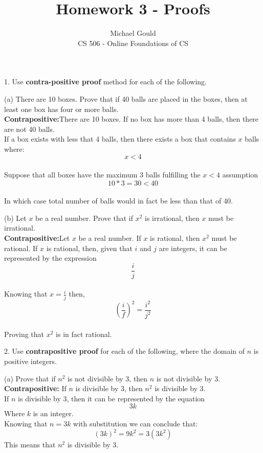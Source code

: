 \documentclass[10pt]{article}
\begin{document}
\title{Homework 3 - Proofs}
\author{Michael Gould\\ 
CS 506 - Online Foundations of CS}

\maketitle

1. Use \textbf{contra-positive proof} method for each of the following.

(a) There are 10 boxes.  Prove that if 40 balls are placed in the boxes, then at least one box has four or more balls.\\
\textbf{Contrapositive:}There are 10 boxes. If no box has more than 4 balls, then there are not 40 balls.\\
If a box exists with less that 4 balls, then there exists a box that contains $x$ balls where: 
$$x < 4$$\\
Suppose that all boxes have the maximum 3 balls fulfilling the $x < 4$ assumption
$$10 * 3 = 30 < 40$$\\ 
In which case total number of balls would in fact be less than that of 40.

(b) Let $x$ be a real number.  Prove that if $x^2$ is irrational, then $x$ must be irrational.\\
\textbf{Contrapositive:}Let $x$ be a real number. If $x$ is rational, then $x^2$ must be rational.  If $x$ is rational, then, given that $i$ and $j$ are integers, it can be represented by the expression 
$$\frac{i}{j}$$\\
Knowing that $x = \frac{i}{j}$ then, 
$$(\frac{i}{f})^2 = \frac{i^2}{j^2}$$\\
Proving that $x^2$ is in fact rational.

2. Use \textbf{contrapositive proof} for each of the following, where the domain of $n$ is positive integers.

(a) Prove that if $n^2$ is not divisible by 3, then $n$ is not divisible by 3.\\
\textbf{Contrapositive:} If $n$ is divisible by 3, then $n^2$ is divisible by 3.\\
If $n$ is divisible by 3, then it can be represented by the equation
$$3k$$
Where $k$ is an integer.\\ 
Knowing that $n = 3k$ with substitution we can conclude that:
$$(3k)^2 = 9k^2 = 3(3k^2)$$
This means that $n^2$ is divisible by 3.
\end{document}
